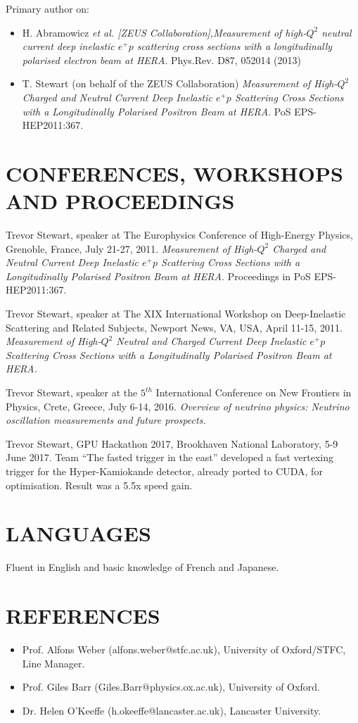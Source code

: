 \documentclass[margin]{res}
\begin{document}
\begin{resume}
Primary author on:
\begin{itemize} \itemsep -2pt
\item H. Abramowicz \textit{et al. [ZEUS Collaboration],Measurement of high-$Q^2$ neutral current deep inelastic $e^+ p$ scattering cross sections with a longitudinally polarised electron beam at HERA}. Phys.Rev. D87, 052014 (2013)
\item T. Stewart (on behalf of the ZEUS Collaboration) \textit{Measurement of High-$Q^2$ Charged and Neutral Current Deep Inelastic $e^{+}p$ Scattering Cross Sections with a Longitudinally Polarised Positron Beam at HERA}. PoS EPS-HEP2011:367.
\end{itemize}


\section{CONFERENCES, WORKSHOPS AND PROCEEDINGS}

Trevor Stewart, speaker at The Europhysics Conference of High-Energy Physics, Grenoble, France, July 21-27, 2011. \textit{Measurement of High-$Q^2$ Charged and Neutral Current Deep Inelastic $e^{+}p$ Scattering Cross Sections with a Longitudinally Polarised Positron Beam at HERA.} Proceedings in PoS EPS-HEP2011:367.

Trevor Stewart, speaker at The XIX International Workshop on Deep-Inelastic Scattering and Related Subjects, Newport News, VA, USA, April 11-15, 2011. \textit{Measurement of High-$Q^2$ Neutral and Charged Current Deep Inelastic $e^+p$ Scattering Cross Sections with a Longitudinally Polarised Positron Beam at HERA.}

Trevor Stewart, speaker at the $5^{th}$ International Conference on New Frontiers in Physics, Crete, Greece, July 6-14, 2016. \textit{Overview of neutrino physics: Neutrino oscillation measurements and future prospects.}

Trevor Stewart, GPU Hackathon 2017, Brookhaven National Laboratory, 5-9 June
2017. Team “The fasted trigger in the east” developed a fast vertexing trigger for the Hyper-Kamiokande detector, already ported to CUDA, for optimisation. Result was a 5.5x speed gain.




\section{LANGUAGES}

Fluent in English and basic knowledge of French and Japanese.

\section{REFERENCES}
\begin{itemize} \itemsep -2pt
\item Prof. Alfons Weber (alfons.weber@stfc.ac.uk), University of Oxford/STFC,
Line Manager.
\item Prof. Giles Barr (Giles.Barr@physics.ox.ac.uk), University of Oxford.
\item Dr. Helen O’Keeffe (h.okeeffe@lancaster.ac.uk), Lancaster University.
\end{itemize}
\end{resume} 
\end{document}
